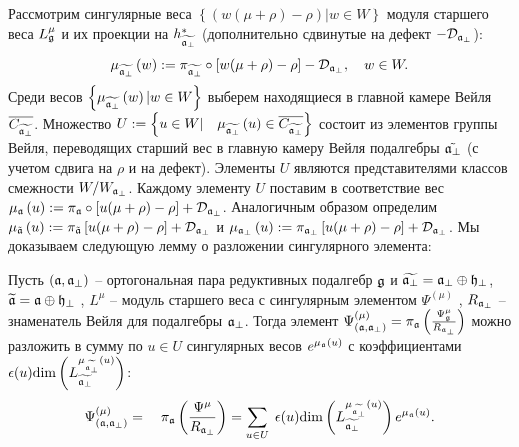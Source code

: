\documentclass[14pt,autoref,href,facsimile
]{disser}
\begin{document}
Рассмотрим сингулярные веса  $\left\{\left( w(\mu +\rho )-\rho \right)|w  \in W \right\}$  модуля старшего веса  $L_{\mathfrak{g}}^{\mu }$ и их проекции на $h_{\widetilde{\mathfrak{a}_{\perp }}}^{\ast }$ (дополнительно сдвинутые на дефект $-\mathcal{D}_{\mathfrak{a}_{\perp }}$):
\begin{equation*}
\mu _{\widetilde{\af_{\perp }}}\left( w\right) :=\pi _{\widetilde{\frak{%
a}_{\perp }}}\circ\left[ w(\mu +\rho )-\rho \right] -\mathcal{D}_{\af_{\perp
}},\quad w\in W.
\end{equation*}
Среди весов  $\left\{\mu _{\widetilde{\mathfrak{a}_{\perp }}}\left( w\right)|w\in W\right\}$ выберем находящиеся в главной камере Вейля $\overline{C_{\widetilde{\mathfrak{a}_{\perp}}}}$. Множество $U:=\left\{ u\in W|\quad \mu _{\widetilde{\mathfrak{a}_{\perp }}}\left( u\right)
\in \overline{C_{\widetilde{\mathfrak{a}_{\perp }}}}\right\}$ состоит из элементов группы Вейля, переводящих старший вес в главную камеру Вейля подалгебры $\tilde{\mathfrak{a}_{\perp}}$ (с учетом сдвига на $\rho$ и на дефект). Элементы $U$ являются представителями классов смежности $W/W_{\mathfrak{a}_{\perp }}$. 
Каждому элементу  $U$ поставим в соответствие вес $\mu _{\mathfrak{a}}\left( u\right) :=\pi _{\mathfrak{a}}\circ\left[ u(\mu +\rho )-\rho \right] +\mathcal{D}_{\mathfrak{a}_{\perp}}$. Аналогичным образом определим $\mu _{\tilde {\mathfrak{a}}}\left( u\right) :=\pi _{\tilde {\mathfrak{a}}}\left[ u(\mu +\rho )-\rho \right] +\mathcal{D}_{\mathfrak{a}_{\perp}}$ и $\mu _{\mathfrak{a}_{\perp}}\left( u\right) :=\pi _{\mathfrak{a}_{\perp}}\left[ u(\mu +\rho )-\rho \right] +\mathcal{D}_{\mathfrak{a}_{\perp}}$. Мы доказываем следующую лемму о разложении сингулярного элемента:
\vspace{-0.3cm}
\begin{lemma}
\label{lemma}
Пусть $\left( \mathfrak{a},\mathfrak{a}_{\perp} \right)$ -- ортогональная пара редуктивных подалгебр $\mathfrak{g}$ и  $\widetilde{\mathfrak{a}_{\perp}}=\mathfrak{a}_{\perp}\oplus \mathfrak{h}_{\perp }$, $\widetilde{\mathfrak{a}}=\mathfrak{a}\oplus\mathfrak{h}_{\perp }$ ,
$L^{\mu }$ -- модуль старшего веса с сингулярным элементом $\Psi ^{\left(\mu \right)}$ ,
$R_{\mathfrak{a}_{\perp }}$ -- знаменатель Вейля для подалгебры $\mathfrak{a}_{\perp }$.
Тогда элемент  $\Psi ^{\left( \mu \right) }_{\left(  \mathfrak{a}, \mathfrak{a}_{\perp} \right)}=\pi _{\mathfrak{a}}\left( \frac{\Psi _{\mathfrak{g}}^{\mu }}{R_{\mathfrak{a}_{\perp }}}\right) $ можно разложить в сумму по  $u\in U$ сингулярных весов $e^{\mu _{\mathfrak{a}}\left( u\right) }$ с коэффициентами $\epsilon (u)\mathrm{\dim}\left( L_{\widetilde{\mathfrak{a}_{\perp}}}^{\mu _{\widetilde{\mathfrak{a}_{\perp}}}\left( u\right) }\right) $:
\begin{equation}
\Psi ^{\left( \mu \right) }_{\left(  \af, \afb \right)}=\quad \pi _{\af}\left( \frac{\Psi^{\mu }}{R_{\af%
_{\perp }}}\right) =\sum_{u\in U}\;\epsilon (u)\mathrm{\dim }
\left( L_{\widetilde{\af_{\perp }}}^{\mu _{%
\widetilde{\af_{\perp }}}\left( u\right) }\right) e^{\mu _{\af}\left( u \right) }.
\end{equation}
\end{lemma}
\end{document}
